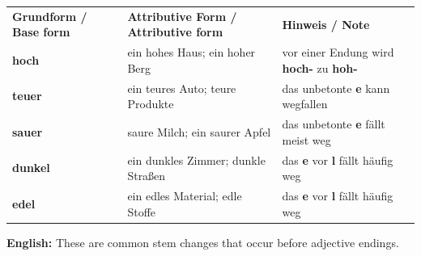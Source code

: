 \documentclass[a4paper,11pt]{article}
\newcommand{\TableEnglish}[1]{{\small\color{SoftGray}\textbf{English: }#1\par}}
\begin{document}
\begin{longtable}{>{\bfseries}p{3cm}|p{5.2cm}|p{6.5cm}}
\rowcolor{HeaderBlueDark}
\color{white}\textbf{Grundform / Base form} &
\color{white}\textbf{Attributive Form / Attributive form} &
\color{white}\textbf{Hinweis / Note} \\
hoch & ein hohes Haus; ein hoher Berg & vor einer Endung wird \textbf{hoch-} zu \textbf{hoh-} \\
teuer & ein teures Auto; teure Produkte & das unbetonte \textbf{e} kann wegfallen \\
sauer & saure Milch; ein saurer Apfel & das unbetonte \textbf{e} fällt meist weg \\
dunkel & ein dunkles Zimmer; dunkle Straßen & das \textbf{e} vor \textbf{l} fällt häufig weg \\
edel & ein edles Material; edle Stoffe & das \textbf{e} vor \textbf{l} fällt häufig weg \\
\end{longtable}

\TableEnglish{These are common stem changes that occur before adjective endings.}
\end{document}
